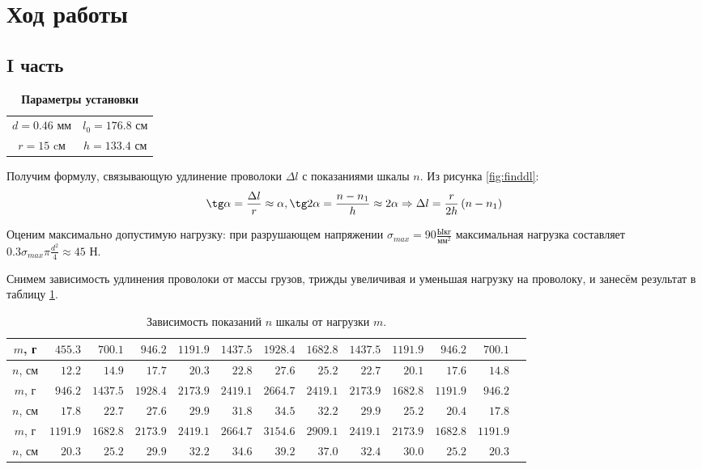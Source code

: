 \documentclass[a4paper, 10pt]{article}
\begin{document}
	\section{Ход работы}
		\subsection*{I часть}
			\begin{table}
				\vspace{-0.5cm}
				\centering
				\caption*{\textbf{Параметры установки}}
				\vspace{-0.25cm}
				\begin{tabular}{cc}
					$d = 0.46 \text{ мм}$ & $l_0 = 176.8 \text{ см}$ \\
					$r = 15 \text{ cм}$ & $h = 133.4 \text{ см}$ \\
				\end{tabular}
			\end{table}
	
			Получим формулу, связывающую удлинение проволоки $\Delta l$ с показаниями шкалы $n$. Из рисунка \ref{fig:finddl}:
			\[\tg\alpha = \frac{\Delta l}{r} \approx \alpha, \tg2\alpha = \frac{n - n_1}{h} \approx 2\alpha \Rightarrow \Delta l = \frac{r}{2h}\left(n - n_1\right)\]
			
			Оценим максимально допустимую нагрузку: при разрушающем напряжении $\sigma_{max} = 90 \frac{Ы\text{кг}}{\text{мм}^2}$ максимальная нагрузка составляет $0.3\sigma_{max}\pi \frac{d^2}{4} \approx 45 \text{ Н}$.
			
			Снимем зависимость удлинения проволоки от массы грузов, трижды увеличивая и уменьшая нагрузку на проволоку, и занесём результат в таблицу \ref{table:n(m)}.
					
			\begin{table}[h]
				\caption{Зависимость показаний $n$ шкалы от нагрузки $m$.}
				\label{table:n(m)}
				\begin{tabular}{|c|r|r|r|r|r|r||r|r|r|r|r|r|}
					\hline
					$m$, г & $455.3$ & $700.1$ & $946.2$ & $1191.9$ & $1437.5$ & $1928.4$ & $1682.8$ & $1437.5$ & $1191.9$ & $946.2$ & $700.1$ \\
					\hline
					$n$, см & $12.2$ & $14.9$ & $17.7$ & $20.3$ & $22.8$ & $27.6$ & $25.2$ & $22.7$ & $20.1$ & $17.6$ & $14.8$ \\
					\hline \hline
					$m$, г & $946.2$ & $1437.5$ & $1928.4$ & $2173.9$ & $2419.1$ & $2664.7$ & $2419.1$ & $2173.9$ & $1682.8$ & $1191.9$ & $946.2$ \\
					\hline
					$n$, см & $17.8$ & $22.7$ & $27.6$ & $29.9$ & $31.8$ & $34.5$ & $32.2$ & $29.9$ & $25.2$ & $20.4$ & $17.8$ \\
					\hline \hline
					$m$, г & $1191.9$ & $1682.8$ & $2173.9$ & $2419.1$ & $2664.7$ & $3154.6$ & $2909.1$ & $2419.1$ & $2173.9$ & $1682.8$ & $1191.9$ \\
					\hline
					$n$, см & $20.3$ & $25.2$ & $29.9$ & $32.2$ & $34.6$ & $39.2$ & $37.0$ & $32.4$ & $30.0$ & $25.2$ & $20.3$ \\
					\hline
				\end{tabular}
			\end{table}
			
\end{document}
